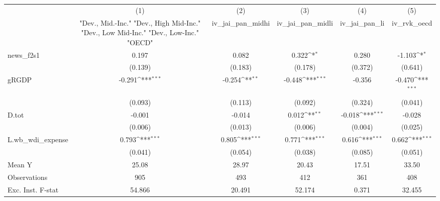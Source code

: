 {
\def\sym#1{\ifmmode^{#1}\else\(^{#1}\)\fi}
\begin{tabular}{l*{5}{c}}
\toprule
            &\multicolumn{1}{c}{(1)}&\multicolumn{1}{c}{(2)}&\multicolumn{1}{c}{(3)}&\multicolumn{1}{c}{(4)}&\multicolumn{1}{c}{(5)}\\
            &\multicolumn{1}{c}{ "Dev., Mid.-Inc." "Dev., High Mid-Inc." "Dev., Low Mid-Inc." "Dev., Low-Inc." "OECD" }&\multicolumn{1}{c}{iv\_jai\_pan\_midhi}&\multicolumn{1}{c}{iv\_jai\_pan\_midli}&\multicolumn{1}{c}{iv\_jai\_pan\_li}&\multicolumn{1}{c}{iv\_rvk\_oecd}\\
\midrule
news\_f2s1   &       0.197         &       0.082         &       0.322\sym{*}  &       0.280         &      -1.103\sym{*}  \\
            &     (0.139)         &     (0.183)         &     (0.178)         &     (0.372)         &     (0.641)         \\
\addlinespace
gRGDP       &      -0.291\sym{***}&      -0.254\sym{**} &      -0.448\sym{***}&      -0.356         &      -0.470\sym{***}\\
            &     (0.093)         &     (0.113)         &     (0.092)         &     (0.324)         &     (0.041)         \\
\addlinespace
D.tot       &      -0.001         &      -0.014         &       0.012\sym{**} &      -0.018\sym{***}&      -0.028         \\
            &     (0.006)         &     (0.013)         &     (0.006)         &     (0.004)         &     (0.025)         \\
\addlinespace
L.wb\_wdi\_expense&       0.793\sym{***}&       0.805\sym{***}&       0.771\sym{***}&       0.616\sym{***}&       0.662\sym{***}\\
            &     (0.041)         &     (0.054)         &     (0.038)         &     (0.085)         &     (0.051)         \\
\midrule
Mean Y      &       25.08         &       28.97         &       20.43         &       17.51         &       33.50         \\
Observations&         905         &         493         &         412         &         361         &         408         \\
Exc. Inst. F-stat&      54.866         &      20.491         &      52.174         &       0.371         &      32.455         \\
\bottomrule
\end{tabular}
}
